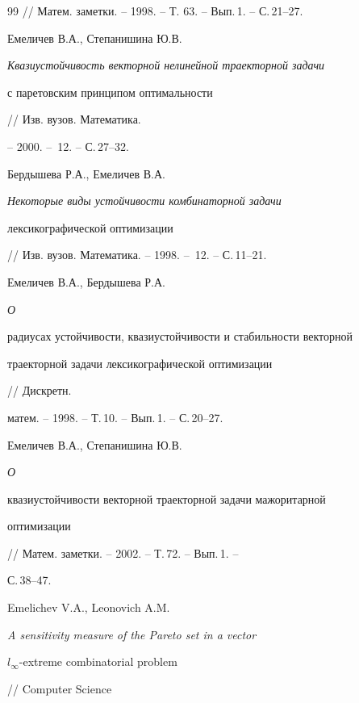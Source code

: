 \begin{thebibliography}{99}
// Матем. заметки. -- 1998. -- Т. 63. -- Вып.\,1. -- С.\,21--27.







Емеличев В.А., Степанишина Ю.В.


{\em Квазиустойчивость векторной нелинейной траекторной задачи


с паретовским принципом оптимальности} // Изв. вузов. Математика.


-- 2000. -- \No\,12. -- С.\,27--32.







Бердышева Р.А., Емеличев В.А.


{\em Некоторые виды устойчивости комбинаторной задачи


лексикографической оптимизации}


// Изв. вузов. Математика. -- 1998. -- \No\,12. -- С.\,11--21.







Емеличев В.А., Бердышева Р.А. {\em О


радиусах устойчивости, квазиустойчивости и стабильности векторной


траекторной задачи лексикографической оптимизации} // Дискретн.


матем. -- 1998. -- Т.\,10. -- Вып.\,1. -- С.\,20--27.







Емеличев В.А., Степанишина Ю.В. {\em О


квазиустойчивости векторной траекторной задачи мажоритарной


оптимизации} // Матем. заметки. -- 2002. -- Т.\,72. -- Вып.\,1. --


С.\,38--47.







Emelichev V.A., Leonovich A.M.


{\em A sensitivity measure of the Pareto set in a vector


$l_\infty$-extreme combinatorial problem} // Computer Science



\end{thebibliography}
